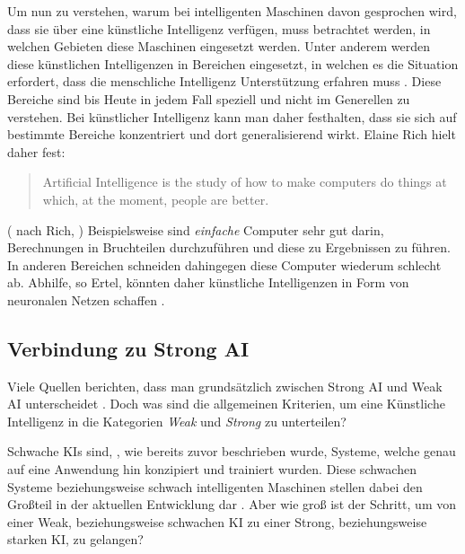             Um nun zu verstehen, warum bei intelligenten Maschinen davon gesprochen wird, dass sie über eine
            künstliche Intelligenz verfügen, muss betrachtet werden, in welchen Gebieten diese Maschinen eingesetzt werden.
            Unter anderem werden diese künstlichen Intelligenzen in Bereichen eingesetzt, in welchen es die Situation
            erfordert, dass die menschliche Intelligenz Unterstützung erfahren muss \cite[s. 2]{ertel2016grundkurs}.
            Diese Bereiche sind bis Heute in jedem Fall speziell und nicht im Generellen zu verstehen. Bei künstlicher
            Intelligenz kann man daher festhalten, dass sie sich auf bestimmte Bereiche konzentriert und dort
            generalisierend wirkt. Elaine Rich hielt daher fest:
            \begin{quote}
                Artificial Intelligence is the study of how to make computers do things at which, at the moment, people are better.
            \end{quote}
            (\citeauthor{ertel2016grundkurs} nach Rich, \citeyear{ertel2016grundkurs})
            Beispielsweise sind \textit{einfache} Computer sehr gut darin, Berechnungen in Bruchteilen durchzuführen und diese zu
            Ergebnissen zu führen.\cite[s. 3]{ertel2016grundkurs}
            In anderen Bereichen schneiden dahingegen diese Computer wiederum schlecht ab. Abhilfe, so Ertel,
            könnten daher künstliche Intelligenzen in Form von neuronalen Netzen schaffen \citeyearpar{ertel2016grundkurs}.

        \subsection{Verbindung zu Strong AI}
            Viele Quellen berichten, dass man grundsätzlich zwischen Strong AI und Weak AI unterscheidet \cite{huang_beef}.
            Doch was sind die allgemeinen Kriterien, um eine Künstliche Intelligenz in die Kategorien \textit{Weak}
            und \textit{Strong} zu unterteilen?

            Schwache KIs sind, , wie bereits zuvor beschrieben wurde, Systeme, welche genau auf eine Anwendung hin
            konzipiert und trainiert wurden. Diese schwachen Systeme beziehungsweise schwach intelligenten Maschinen
            stellen dabei den Großteil in der aktuellen Entwicklung dar \cite{brendel_2019}. Aber wie groß ist der
            Schritt, um von einer Weak, beziehungsweise schwachen KI zu einer Strong, beziehungsweise starken KI, zu
            gelangen?

